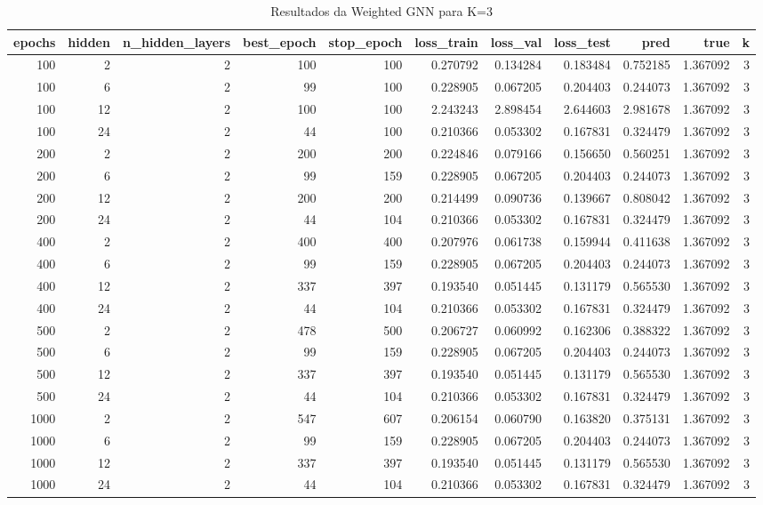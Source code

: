 \begin{table}
\caption{Resultados da Weighted GNN para K=3}
\label{tab:weighted_gnn_results_k3}
\begin{tabular}{rrrrrrrrrrr}
\toprule
epochs & hidden & n\_hidden\_layers & best\_epoch & stop\_epoch & loss\_train & loss\_val & loss\_test & pred & true & k \\
\midrule
100 & 2 & 2 & 100 & 100 & 0.270792 & 0.134284 & 0.183484 & 0.752185 & 1.367092 & 3 \\
100 & 6 & 2 & 99 & 100 & 0.228905 & 0.067205 & 0.204403 & 0.244073 & 1.367092 & 3 \\
100 & 12 & 2 & 100 & 100 & 2.243243 & 2.898454 & 2.644603 & 2.981678 & 1.367092 & 3 \\
100 & 24 & 2 & 44 & 100 & 0.210366 & 0.053302 & 0.167831 & 0.324479 & 1.367092 & 3 \\
200 & 2 & 2 & 200 & 200 & 0.224846 & 0.079166 & 0.156650 & 0.560251 & 1.367092 & 3 \\
200 & 6 & 2 & 99 & 159 & 0.228905 & 0.067205 & 0.204403 & 0.244073 & 1.367092 & 3 \\
200 & 12 & 2 & 200 & 200 & 0.214499 & 0.090736 & 0.139667 & 0.808042 & 1.367092 & 3 \\
200 & 24 & 2 & 44 & 104 & 0.210366 & 0.053302 & 0.167831 & 0.324479 & 1.367092 & 3 \\
400 & 2 & 2 & 400 & 400 & 0.207976 & 0.061738 & 0.159944 & 0.411638 & 1.367092 & 3 \\
400 & 6 & 2 & 99 & 159 & 0.228905 & 0.067205 & 0.204403 & 0.244073 & 1.367092 & 3 \\
400 & 12 & 2 & 337 & 397 & 0.193540 & 0.051445 & 0.131179 & 0.565530 & 1.367092 & 3 \\
400 & 24 & 2 & 44 & 104 & 0.210366 & 0.053302 & 0.167831 & 0.324479 & 1.367092 & 3 \\
500 & 2 & 2 & 478 & 500 & 0.206727 & 0.060992 & 0.162306 & 0.388322 & 1.367092 & 3 \\
500 & 6 & 2 & 99 & 159 & 0.228905 & 0.067205 & 0.204403 & 0.244073 & 1.367092 & 3 \\
500 & 12 & 2 & 337 & 397 & 0.193540 & 0.051445 & 0.131179 & 0.565530 & 1.367092 & 3 \\
500 & 24 & 2 & 44 & 104 & 0.210366 & 0.053302 & 0.167831 & 0.324479 & 1.367092 & 3 \\
1000 & 2 & 2 & 547 & 607 & 0.206154 & 0.060790 & 0.163820 & 0.375131 & 1.367092 & 3 \\
1000 & 6 & 2 & 99 & 159 & 0.228905 & 0.067205 & 0.204403 & 0.244073 & 1.367092 & 3 \\
1000 & 12 & 2 & 337 & 397 & 0.193540 & 0.051445 & 0.131179 & 0.565530 & 1.367092 & 3 \\
1000 & 24 & 2 & 44 & 104 & 0.210366 & 0.053302 & 0.167831 & 0.324479 & 1.367092 & 3 \\
\bottomrule
\end{tabular}
\end{table}

